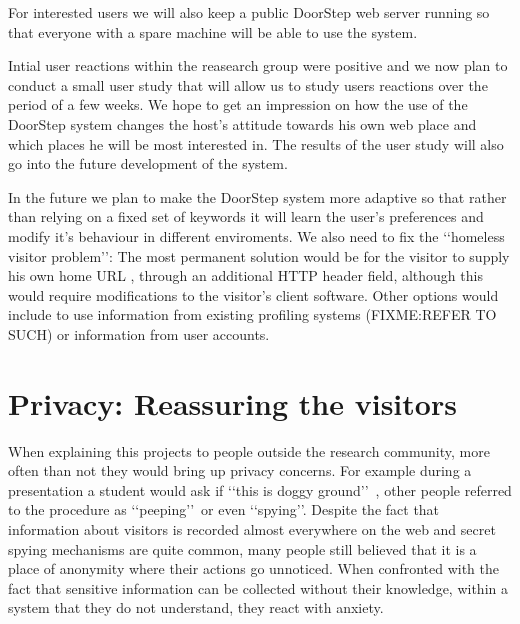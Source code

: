 \documentclass[a4paper]{danarticle}
\begin{document}
    For interested users we will also keep a public DoorStep web server running
    so that everyone with a spare machine will be able to use the system.
    
    Intial user reactions within the reasearch group were positive and we now
    plan to conduct a small user study that will allow us to study users
    reactions over the period of a few weeks. We hope to get an impression on how
    the use of the DoorStep system changes the host's attitude towards his own
    web place and which places he will be most interested in. The results of the
    user study will also go into the future development of the system.
    
    In the future we plan to make the DoorStep system more adaptive so that
    rather than relying on a fixed set of keywords it will learn the user's
    preferences and modify it's behaviour in different enviroments. We also need
    to fix the \lq\lq homeless visitor problem\rq\rq : The most permanent
    solution would be for the visitor to supply his own home URL \cite{webaware},
    through an additional HTTP header field, although this would require
    modifications to the visitor's client software. Other options would include
    to use information from existing profiling systems (FIXME:REFER TO SUCH) or
    information from user accounts.
  \section{Privacy: Reassuring the visitors}
    When explaining this projects to people outside the research community, more
    often than not they would bring up privacy concerns. For example during a
    presentation a student would ask if \lq\lq this is doggy ground\rq\rq\ ,
    other people referred to the procedure as \lq\lq peeping\rq\rq\ or even
    \lq\lq spying\rq\rq . Despite the fact that information about visitors is
    recorded almost everywhere on the web and secret spying mechanisms are
    quite common, many people still believed that it is a place of anonymity
    where their actions go unnoticed. When confronted with the fact
    that sensitive information can be collected without their knowledge, within a system that they do not
    understand, they react with anxiety.
    
\end{document}
